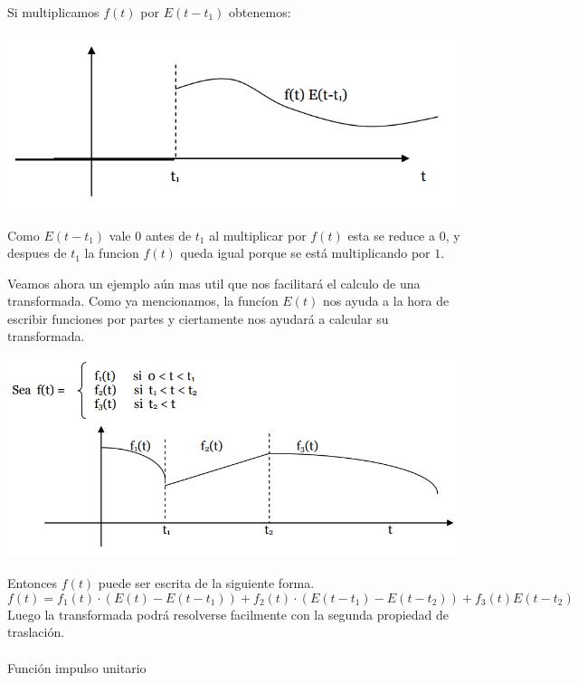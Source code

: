 \documentclass[]{article}
\begin{document}
Si multiplicamos $f(t)$ por $E(t-t_{1})$ obtenemos: 

\includegraphics{../../../Imagenes/Superior/Superior04.PNG}

Como $E(t-t_{1})$ vale $0$ antes de $t_{1}$ al multiplicar por $f(t)$ esta se reduce a $0$, y despues de $t_{1}$ la funcion $f(t)$ queda igual porque se está multiplicando por $1$.

Veamos ahora un ejemplo aún mas util que nos facilitará el calculo de una transformada. Como ya mencionamos, la funcíon $E(t)$ nos ayuda a la hora de escribir funciones por partes y ciertamente nos ayudará a calcular su transformada.

\includegraphics{../../../Imagenes/Superior/Superior05.PNG}


Entonces $f(t)$ puede ser escrita de la siguiente forma.
$$
f(t) = f_{1}(t)\cdot (E(t)-E(t-t_{1})) + f_{2}(t) \cdot (E(t-t_{1})-E(t-t_{2})) + f_{3}(t)E(t-t_{2})
$$
Luego la transformada podrá resolverse facilmente con la segunda propiedad de traslación.
\\
\\
\large Función impulso unitario
\\
\normalsize
\end{document}

